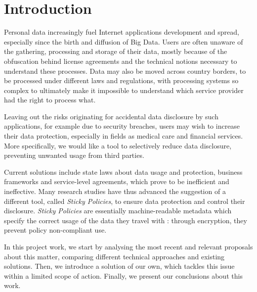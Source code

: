 \chapter{Introduction}
\label{Intro}
\thispagestyle{empty}

\noindent 
Personal data increasingly fuel Internet applications development and spread, especially since the birth and diffusion of Big Data. Users are often unaware of the gathering, processing and storage of their data, mostly because of the obfuscation behind license agreements and the technical notions necessary to understand these processes. Data may also be moved across country borders, to be processed under different laws and regulations, with processing systems so complex to ultimately make it impossible to understand which service provider had the right to process what.

Leaving out the risks originating for accidental data disclosure by such applications, for example due to security breaches, users may wish to increase their data protection, especially in fields as medical care and financial services. More specifically, we would like a tool to selectively reduce data disclosure, preventing unwanted usage from third parties.

Current solutions include state laws about data usage and protection, business frameworks and service-level agreements, which prove to be inefficient and ineffective. Many research studies have thus advanced the suggestion of a different tool, called \textit{Sticky Policies}, to ensure data protection and control their disclosure. \textit{Sticky Policies} are essentially machine-readable metadata which specify the correct usage of the data they travel with \cite{pearson2011sticky}: through encryption, they prevent policy non-compliant use.

In this project work, we start by analysing the most recent and relevant proposals about this matter, comparing different technical approaches and existing solutions. Then, we introduce a solution of our own, which tackles this issue within a limited scope of action. Finally, we present our conclusions about this work.


\iffalse
- internet funziona sempre più producendo risultati a partire da dati personali, e questa tendenza sta aumentando grazie al diffondersi di big data
- gli utenti sono, nella maggior parte dei casi, ignari dell'uso che viene fatto dei loro dati personali, e in ogni caso, spesso, tali servizi avvengono sotto legislazioni diverse, o avvengono per conto di ulteriori terze parti che potrebbero non rispettare i permessi inizialmente accordati.
- questi costituiscono dei rischi per la violazione della privacy e in generale potrebbero costituire una vulnerabilità, esposizione, degli utenti agli attacchi su internet.
- vorremmo che fosse possibile per gli utenti scegliere selettivamente cosa condividere, dando loro la possibilità di limitare la diffusione dei loro dati personali dovuta a servizi esterni.
- per fare ciò si propone l'uso di sticky policies, ossia metadati che restano agganciati ai dati a cui si riferiscono e danno indicazioni sul loro corretto utilizzo.
\fi